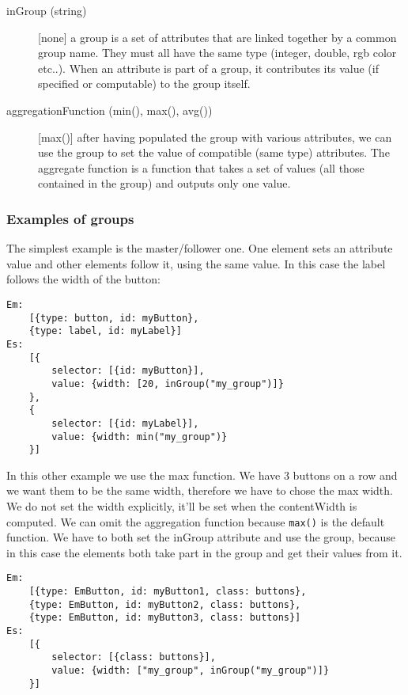 \begin{description}
    \item[inGroup (string)] [none] a group is a set of attributes that are linked together by a common group name. They must all have the same type (integer, double, rgb color etc..). When an attribute is part of a group, it contributes its value (if specified or computable) to the group itself.
    \item[aggregationFunction (min(), max(), avg())] [max()] after having populated the group with various attributes, we can use the group to set the value of compatible (same type) attributes. The aggregate function is a function that takes a set of values (all those contained in the group) and outputs only one value.
\end{description}

\subsubsection{Examples of groups}

The simplest example is the master/follower one. One element sets an attribute value and other elements follow it, using the same value. In this case the label follows the width of the button:

\begin{verbatim}
Em:
    [{type: button, id: myButton},
    {type: label, id: myLabel}]
Es:
    [{
        selector: [{id: myButton}],
        value: {width: [20, inGroup("my_group")]}
    },
    {
        selector: [{id: myLabel}],
        value: {width: min("my_group")}
    }]
\end{verbatim}

In this other example we use the max function. We have 3 buttons on a row and we want them to be the same width, therefore we have to chose the max width. We do not set the width explicitly, it'll be set when the contentWidth is computed. We can omit the aggregation function because \verb|max()| is the default function. We have to both set the inGroup attribute and use the group, because in this case the elements both take part in the group and get their values from it.
\begin{verbatim}
Em:
    [{type: EmButton, id: myButton1, class: buttons},
    {type: EmButton, id: myButton2, class: buttons},
    {type: EmButton, id: myButton3, class: buttons}]
Es:
    [{
        selector: [{class: buttons}],
        value: {width: ["my_group", inGroup("my_group")]}
    }]
\end{verbatim}
